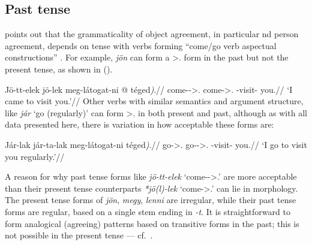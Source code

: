 \subsection{Past tense}\label{sub:past-tense}

\Textcite{denDikken2004} points out that the grammaticality of object
agreement, in particular \Second{}nd person agreement, depends on tense with
verbs forming \enquote{come/go verb aspectual constructions} . For example,
\emph{jön} can form a \Fsg>\Second.\Obj{} form in the past but not the present
tense, as shown in (\nextx).

\ex
    \begingl
        \gla 	Jö-tt-elek \nogloss{/ } \ljudge*jö-lek meg-látogat-ni \nogloss{(} @ téged\emph{)}.//
        \glb 	come-\Pst-\Fsg>\Second.\Obj{} come-\Fsg>\Second.\Obj{} \Vm-visit-\Inf{} you.\Acc{}//
        \glft 	\enquote*{I came to visit you.}//
    \endgl
\xe
Other verbs with similar semantics and argument structure, like \emph{jár}
\enquote*{go (regularly)} can form \Fsg>\Second.\Obj{} in both present and
past, although as with all data presented here, there is variation in how
acceptable these forms are:

\ex
    \begingl
        \gla 	Jár-lak \nogloss{/} jár-ta-lak meg-látogat-ni \nogloss{(}téged\emph{)}.//
        \glb 	go-\Fsg>\Second.\Obj{} go-\Pst-\Fsg>\Second.\Obj{} \Vm-visit-\Inf{} you.\Acc//
        \glft 	\enquote*{I go to visit you regularly.}//
    \endgl
\xe

A reason for why past tense forms like \emph{jö-tt-elek}
\enquote*{come-\Pst-\Fsg>\Second.\Obj} are more acceptable than their present
tense counterparts \emph{*jö(l)-lek} \enquote*{come-\Fsg>\Second.\Obj} can lie
in morphology. The present tense forms of \emph{jön}, \emph{megy}, \emph{lenni}
are irregular, while their past tense forms are regular, based on a single stem
ending in \emph{-t}. It is straightforward to form analogical (agreeing)
patterns based on transitive forms in the past; this is not possible in the
present tense --- cf.~.

